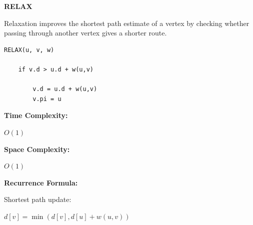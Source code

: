 \documentclass[a4paper,12pt]{article}
\begin{document}
\begin{tcolorbox}[
    colback=gray!30,
    colframe=black,
    boxrule=1pt,
    arc=0mm
]

\begin{tcolorbox}[
    colback=gray!10,
    colframe=black,
    arc=0mm
]
\centering
{\Huge\bfseries RELAX}
\end{tcolorbox}


\begin{tcolorbox}[
    colback=gray!10,
    colframe=black,
    arc=0mm
]
\small
Relaxation improves the shortest path estimate of a vertex by checking
whether passing through another vertex gives a shorter route.
\end{tcolorbox}


\begin{tcolorbox}[
    colback=black!5,
    colframe=black,
    arc=0mm,
    title=Pseudo-code
]
\tiny
\begin{lstlisting}
RELAX(u, v, w)

    if v.d > u.d + w(u,v)

        v.d = u.d + w(u,v)
        v.pi = u
\end{lstlisting}
\end{tcolorbox}


\begin{tcolorbox}[
    colback=cyan!20,
    colframe=black,
    arc=0mm
]
\small
\textbf{Time Complexity:}

$O(1)$
\end{tcolorbox}


\begin{tcolorbox}[
    colback=violet!20,
    colframe=black,
    arc=0mm
]
\small
\textbf{Space Complexity:}

$O(1)$
\end{tcolorbox}


\begin{tcolorbox}[
    colback=pink!20,
    colframe=black,
    arc=0mm
]
\small
\textbf{Recurrence Formula:}

Shortest path update:

$d[v]=\min(d[v],d[u]+w(u,v))$
\end{tcolorbox}

\end{tcolorbox}
\end{document}
